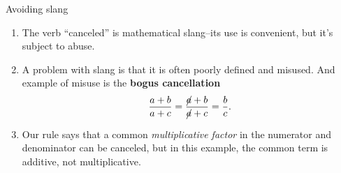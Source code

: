\documentclass[portrait,fleqn,12pt]{beamer}
\newenvironment{handlist}
   {\begin{enumerate}[\faHandPointRight]
       \addtolength{\itemsep}{0.0\itemsep}}
     {\end{enumerate}}
\begin{document}
\begin{frame}{Avoiding slang}

\begin{handlist}

\item The verb ``canceled'' is mathematical slang--its use is convenient, but it's  subject to abuse.  

\item A problem with slang is that it is often  poorly defined and misused.  And example of misuse is the \textbf{bogus cancellation}
\begin{equation*}
   \frac{a+b}{a+c} =  \frac{\cancel{a}+b}{\cancel{a} +c} = \frac{b}{c}.
\end{equation*}

\item Our rule says that a common \emph{multiplicative factor} in the numerator and denominator can be canceled, but in this example,
the common term is additive, not multiplicative.
\end{handlist}




\end{frame}
\end{document}
